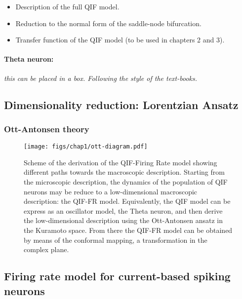 \begin{itemize}
\item Description of the full QIF model.
\item Reduction to the normal form of the saddle-node bifurcation.
\item Transfer function of the QIF model (to be used in chapters 2 and 3).
\end{itemize}


\paragraph{Theta neuron:} {\it \color{red} this can be placed in a
  box. Following the style of the text-books.}

\subsection{Dimensionality reduction: Lorentzian Ansatz}


\subsubsection{Ott-Antonsen theory}

\begin{figure}[htbp]
\centerline{\texttt{[image: figs/chap1/ott-diagram.pdf]}}
\caption[From QIF/Theta to QIF-FR/QIF-Kuramoto]{\label{fig:ott} Scheme
of the derivation of the QIF-Firing Rate model showing different
paths towards the macroscopic description. Starting from the
microscopic description, the dynamics of the population of QIF neurons
may be reduce to a low-dimensional macroscopic description: the QIF-FR
model. Equivalently, the QIF model can be express as an oscillator
model, the Theta neuron, and then derive the low-dimensional
description using the Ott-Antonsen ansatz in the Kuramoto space. From
there the QIF-FR model can be obtained by means of the conformal
mapping, a transformation in the complex plane.}
\end{figure}

\subsection{Firing rate model for current-based spiking neurons}

